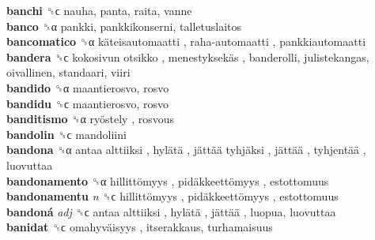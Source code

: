 \textbf{banchi} ␝ϲ  nauha, panta, raita, vanne  \\
\textbf{banco} ␝α  pankki, pankkikonserni, talletuslaitos  \\
\textbf{bancomatico} ␝α   käteisautomaatti ,  raha-automaatti , pankkiautomaatti  \\
\textbf{bandera} ␝ϲ   kokosivun otsikko ,  menestyksekäs , banderolli, julistekangas, oivallinen, standaari, viiri  \\
\textbf{bandido} ␝α  maantierosvo, rosvo  \\
\textbf{bandidu} ␝ϲ  maantierosvo, rosvo  \\
\textbf{banditismo} ␝α   ryöstely , rosvous  \\
\textbf{bandolin} ␝ϲ  mandoliini  \\
\textbf{bandona} ␝α   antaa alttiiksi ,  hylätä ,  jättää tyhjäksi ,  jättää ,  tyhjentää , luovuttaa  \\
\textbf{bandonamento} ␝α   hillittömyys ,  pidäkkeettömyys , estottomuus  \\
\textbf{bandonamentu} \emph{n}  ␝ϲ   hillittömyys ,  pidäkkeettömyys , estottomuus  \\
\textbf{bandoná} \emph{adj}  ␝ϲ   antaa alttiiksi ,  hylätä ,  jättää , luopua, luovuttaa  \\
\textbf{banidat} ␝ϲ   omahyväisyys , itserakkaus, turhamaisuus  \\
